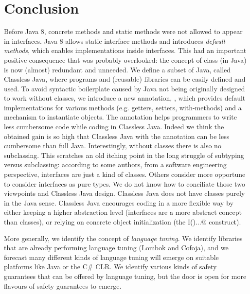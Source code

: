 \section{Conclusion}\label{sec:conclusion}

Before Java 8, concrete methods and static methods were not allowed
to appear in interfaces.  Java 8 allows static interface methods and
introduces \emph{default methods}, which enables implementations
inside interfaces. This had an important positive consequence that
was probably overlooked: the concept of class
(in Java) is now (almost) redundant and unneeded.  We define a subset of Java,
called Classless Java, where programs and (reusable) libraries can be
easily defined and used.  To avoid syntactic boilerplate
caused by Java not being originally designed to work without classes,
we introduce a new annotation, \mixin, which provides default implementations
for various methods (e.g. getters, setters, with-methods) and a
mechanism to instantiate objects. The \mixin annotation helps programmers
to write less cumbersome code while coding in Classless Java. Indeed
we think the obtained gain is so high that Classless Java with the \mixin
annotation can be less cumbersome than full Java.
Interestingly, without classes there is also no subclassing. This scratches an old
  itching point in the long struggle of subtyping versus subclassing:
  according to some authors, from a software engineering perspective,
  interfaces are just a kind of classes. Others consider more
  opportune to consider interfaces as pure types. We do not know how to conciliate
  those two viewpoints and Classless Java design.
  Classless Java does not have classes purely in the Java sense.  
 Classless Java encourages coding in a more flexible way by either
 keeping a higher abstraction level (interfaces are a more abstract
 concept than classes), or relying on concrete object initialization
 (the \Q@new I(){...}@ construct).
 
 More generally, we identify the concept of \emph{language tuning}.
 We identify libraries that are already performing language tuning (Lombok and Cofoja), and 
 we forecast many different kinds of language tuning will emerge on suitable platforms like Java or the C\# CLR.
 We identify various kinds of safety guarantees that can be offered by language tuning, but the door is open for more flavours of safety guarantees to emerge.

